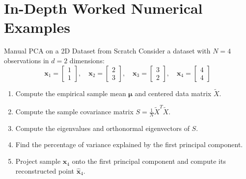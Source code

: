 \section{In-Depth Worked Numerical Examples}

\begin{examplebox}{Manual PCA on a 2D Dataset from Scratch}
Consider a dataset with $N = 4$ observations in $d = 2$ dimensions:
\begin{equation}
\mathbf{x}_1 = \begin{bmatrix} 1 \\ 1 \end{bmatrix}, \quad \mathbf{x}_2 = \begin{bmatrix} 2 \\ 3 \end{bmatrix}, \quad \mathbf{x}_3 = \begin{bmatrix} 3 \\ 2 \end{bmatrix}, \quad \mathbf{x}_4 = \begin{bmatrix} 4 \\ 4 \end{bmatrix}
\end{equation}
\begin{enumerate}
    \item Compute the empirical sample mean $\boldsymbol{\mu}$ and centered data matrix $\tilde{X}$.
    \item Compute the sample covariance matrix $S = \frac{1}{N}\tilde{X}^T \tilde{X}$.
    \item Compute the eigenvalues and orthonormal eigenvectors of $S$.
    \item Find the percentage of variance explained by the first principal component.
    \item Project sample $\mathbf{x}_4$ onto the first principal component and compute its reconstructed point $\hat{\mathbf{x}}_4$.
\end{enumerate}


\end{examplebox}
